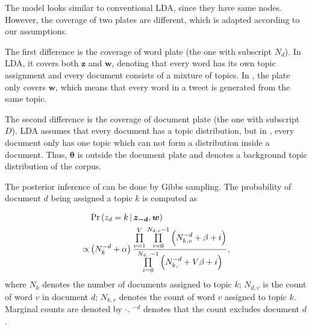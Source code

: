 The model looks similar to conventional LDA, since they have same nodes. However, the coverage of two plates are different, which is adapted according to our assumptions.

The first difference is the coverage of word plate (the one with subscript $N_d$).
In LDA, it covers both $\bm{z}$ and $\bm{w}$, denoting that every word has its own topic assignment and every document consists of a mixture of topics.
In \stlda, the plate only covers $\bm{w}$, which means that every word in a tweet is generated from the same topic.

The second difference is the coverage of document plate (the one with subscript $D$). LDA assumes that every document has a topic distribution, but in \stlda, every document only has one topic which can not form a distribution inside a document. Thus, $\bm{\theta}$ is outside the document plate and denotes a background topic distribution of the corpus.

The posterior inference of \stlda can be done by Gibbs sampling. The probability of document $d$ being assigned a topic $k$ is computed as

\begin{align}
&\Pr \left( z_d=k \,|\, \bm{z_{-d}},\bm{w} \right) \notag\\
\propto &\left( N_k^{-d} + \alpha \right) \frac {\prod\limits_{v=1}^{V} \prod\limits_{i=0}^{N_{d,v}-1} \left( N_{k,v}^{-d} + \beta + i \right)} {\prod\limits_{i=0}^{N_{d,\cdot}-1} \left( N_{k,\cdot}^{-d} + V\beta + i \right)},
\end{align}
where $N_k$ denotes the number of documents assigned to topic $k$; $N_{d,v}$ is the count of word $v$ in document $d$; $N_{k,v}$ denotes the count of word $v$ assigned to topic $k$. Marginal counts are denoted by $\cdot$. $^{-d}$ denotes that the count excludes document $d$.




